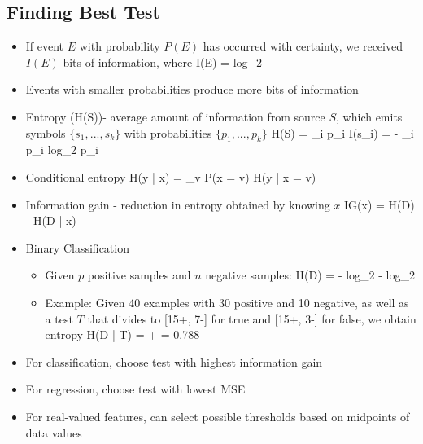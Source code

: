 \documentclass[12pt]{article}
\newenvironment{eqn}{\equation\alignedat{3}}{\endalignedat\endequation}
\begin{document}
\subsection{Finding Best Test}

\begin{itemize}
	\item If event $E$ with probability $P(E)$ has occurred with certainty, we received $I(E)$ bits of information, where
	\begin{eqn}
		I(E) = log_2 
	\end{eqn}
	\item Events with smaller probabilities produce more bits of information 
	\item Entropy (H(S))- average amount of information from source $S$, which emits symbols $\{s_1, ..., s_k\}$ with probabilities $\{p_1, ..., p_k\}$
	\begin{eqn}
		H(S) = \Sigma_i p_i I(s_i) = - \Sigma_i p_i log_2 p_i
	\end{eqn}
	\item Conditional entropy
	\begin{eqn}
		H(y | x) = \Sigma_v P(x = v) H(y | x = v)
	\end{eqn}
	\item Information gain - reduction in entropy obtained by knowing $x$
	\begin{eqn}
		IG(x) = H(D) - H(D | x)
	\end{eqn}
	\item Binary Classification 
	\begin{itemize}
		\item Given $p$ positive samples and $n$ negative samples:
		\begin{eqn}
			H(D) = - log_2  -  log_2 
		\end{eqn}
		\item Example: Given 40 examples with 30 positive and 10 negative, as well as a test $T$ that divides to [15+, 7-] for true and [15+, 3-] for false, we obtain entropy 
		\begin{eqn}
			H(D | T) =  +   = 0.788
		\end{eqn}
	\end{itemize}
	\item For classification, choose test with highest information gain 
	\item For regression, choose test with lowest MSE
	\item For real-valued features, can select possible thresholds based on midpoints of data values
\end{itemize}
\end{document}
